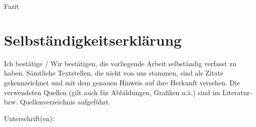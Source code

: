 Fazit

\chapter{Selbständigkeitserklärung}

Ich bestätige / Wir bestätigen, die vorliegende Arbeit selbständig verfasst zu haben. Sämtliche Textstellen, die nicht von uns stammen, sind als Zitate gekennzeichnet und mit dem genauen Hinweis auf ihre Herkunft versehen. Die verwendeten Quellen (gilt auch für Abbildungen, Grafiken u.ä.) sind im Literatur- bzw. Quellenverzeichnis aufgeführt.



Unterschrift(en):
